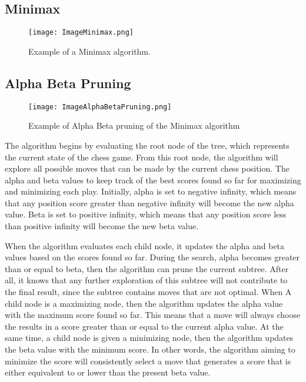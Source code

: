 \documentclass[conference]{IEEEtran}
\begin{document}
\subsection{Minimax}

\begin{figure}[htbp]
\centerline{\texttt{[image: ImageMinimax.png]}}
\caption{Example of a Minimax algorithm.}
\label{fig}
\end{figure}

\subsection{Alpha Beta Pruning}

\begin{figure}[htbp]
\centerline{\texttt{[image: ImageAlphaBetaPruning.png]}}
\caption{Example of Alpha Beta pruning of the Minimax algorithm}
\label{fig}
\end{figure}

The algorithm begins by evaluating the root node of the tree, which represents the current state of the chess game. From this root node, the algorithm will explore all possible moves that can be made by the current chess position. The alpha and beta values to keep track of the best scores found so far for maximizing and minimizing each play. Initially, alpha is set to negative infinity, which means that any position score greater than negative infinity will become the new alpha value. Beta is set to positive infinity, which means that any position score less than positive infinity will become the new beta value.\vspace{10pt}

When the algorithm evaluates each child node, it updates the alpha and beta values based on the scores found so far. During the search, alpha becomes greater than or equal to beta, then the algorithm can prune the current subtree. After all, it knows that any further exploration of this subtree will not contribute to the final result, since the subtree contains moves that are not optimal. When A child node is a maximizing node, then the algorithm updates the alpha value with the maximum score found so far. This means that a move will always choose the results in a score greater than or equal to the current alpha value. At the same time, a child node is given a minimizing node, then the algorithm updates the beta value with the minimum score. In other words, the algorithm aiming to minimize the score will consistently select a move that generates a score that is either equivalent to or lower than the present beta value.
\end{document}
